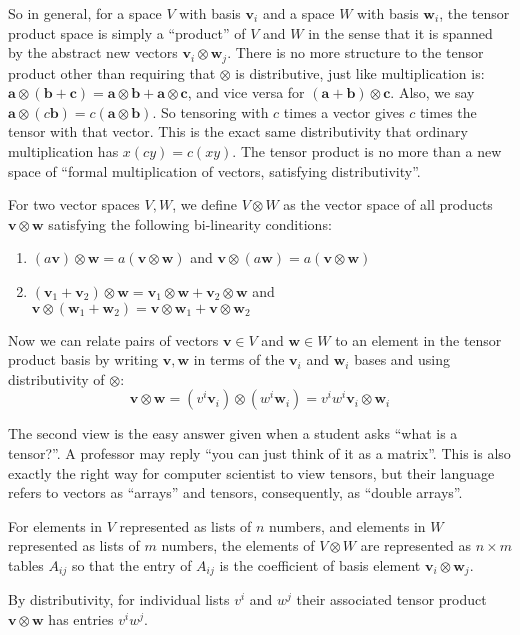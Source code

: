 \documentclass[../master.tex]{subfiles}
\begin{document}
	
	So in general, for a space $V$ with basis $\mathbf v_i$ and a space $W$ with basis $\mathbf w_i$, the tensor product space is simply a ``product'' of $V$ and $W$ in the sense that it is spanned by the abstract new vectors $\mathbf v_i \otimes \mathbf w_j$. There is no more structure to the tensor product other than requiring that $\otimes$ is distributive, just like multiplication is: $\mathbf a \otimes (\mathbf b + \mathbf c) = \mathbf a \otimes \mathbf b + \mathbf a \otimes \mathbf c$, and vice versa for $(\mathbf a + \mathbf b) \otimes \mathbf c$. Also, we say $\mathbf a \otimes (c \mathbf b) = c (\mathbf a \otimes \mathbf b)$. So tensoring with $c$ times a vector gives $c$ times the tensor with that vector. This is the exact same distributivity that ordinary multiplication has $x(cy) = c (xy)$. The tensor product is no more than a new space of ``formal multiplication of vectors, satisfying distributivity''.
	
	
	\begin{defn}
		For two vector spaces $V,W$, we define $V \otimes W$ as the vector space of all products $\mathbf v \otimes \mathbf w$ satisfying the following bi-linearity conditions:
		\begin{enumerate}
			\item $(a \mathbf v) \otimes \mathbf w = a (\mathbf v \otimes \mathbf w)$ and $\mathbf v \otimes (a \mathbf w) = a (\mathbf v \otimes \mathbf w)$
			\item $(\mathbf v_1 + \mathbf v_2) \otimes \mathbf w = \mathbf v_1 \otimes \mathbf w + \mathbf v_2 \otimes \mathbf w$ and\\ $\mathbf v\otimes (\mathbf w_1 + \mathbf w_2) = \mathbf v \otimes \mathbf w_1 + \mathbf v \otimes \mathbf w_2$
		\end{enumerate}
	\end{defn}
	
	 Now we can relate pairs of vectors $\mathbf v \in V$ and $\mathbf w \in W$ to an element in the tensor product basis by writing $\mathbf v, \mathbf w$ in terms of the $\mathbf v_i$ and $\mathbf w_i$ bases and using distributivity of $\otimes$:
	\begin{equation*}
		\mathbf v \otimes \mathbf w = (v^i \mathbf v_i) \otimes (w^i \mathbf w_i) = v^i w^i \mathbf v_i \otimes \mathbf w_i
	\end{equation*}

	The second view is the easy answer given when a student asks ``what is a tensor?''. A professor may reply ``you can just think of it as a matrix''. This is also exactly the right way for computer scientist to view tensors, but their language refers to vectors as ``arrays'' and tensors, consequently, as ``double arrays''.
	\begin{view}
		For elements in $V$ represented as lists of $n$ numbers, and elements in $W$ represented as lists of $m$ numbers, the elements of $V \otimes W$ are represented as $n \times m$ tables $A_{ij}$ so that the entry of $A_{ij}$ is the coefficient of basis element $\mathbf v_i \otimes \mathbf w_j$.
	\end{view}
	By distributivity, for individual lists $v^i$ and $w^j$ their associated tensor product $\mathbf v \otimes \mathbf w$ has entries $v^i w^j$.
	
\end{document}
